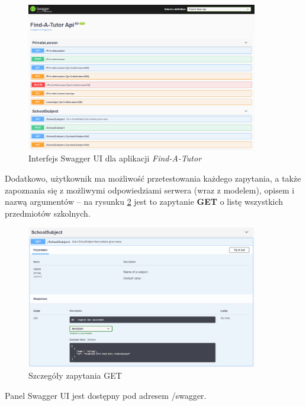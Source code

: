 \documentclass[12pt]{article}
\numberwithin{figure}{section}
\begin{document}
\begin{sloppypar}
\begin{figure}[!htbp] 
    \centering
    \includegraphics[width=0.9\textwidth]{images/chapter_3/swagger.png}
    \caption{Interfejs Swagger UI dla aplikacji \textit{Find-A-Tutor}}
    \label{fig:swagger}
\end{figure}
    
Dodatkowo, użytkownik ma możliwość przetestowania każdego zapytania, a także zapoznania się z możliwymi odpowiedziami serwera (wraz z modelem), opisem i nazwą argumentów -- na rysunku \ref{fig:swagger-get} jest to zapytanie \textbf{GET} o listę wszystkich przedmiotów szkolnych. 
    
\begin{figure}[!htbp] 
    \centering
    \includegraphics[width=0.9\textwidth]{images/chapter_3/swagger-get.png}
    \caption{Szczegóły zapytania GET}
    \label{fig:swagger-get}
\end{figure}
    
Panel Swagger UI jest dostępny pod adresem /swagger.


\end{sloppypar}
\end{document}
